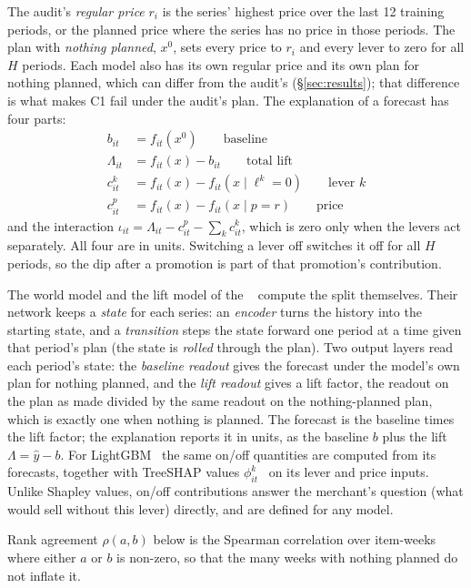 The audit's \emph{regular price} $r_i$ is the series' highest price over the
last 12 training periods, or the planned price where the series has no price in
those periods. The plan with \emph{nothing planned}, $x^{0}$, sets every price
to $r_i$ and every lever to zero for all $H$ periods. Each model also has its
own regular price and its own plan for nothing planned, which can differ from
the audit's (\S\ref{sec:results}); that difference is what makes C1 fail under
the audit's plan. The explanation of a forecast has four parts:
\begin{align}
  b_{it} &= f_{it}(x^{0}) \qquad \text{baseline}\\
  \Lambda_{it} &= f_{it}(x) - b_{it} \qquad \text{total lift}\\
  c^{k}_{it} &= f_{it}(x) - f_{it}(x \mid \ell^{k} = 0) \qquad \text{lever } k\\
  c^{p}_{it} &= f_{it}(x) - f_{it}(x \mid p = r) \qquad \text{price}
\end{align}
and the interaction $\iota_{it} = \Lambda_{it} - c^{p}_{it} - \sum_k c^{k}_{it}$,
which is zero only when the levers act separately. All four are in units.
Switching a lever off switches it off for all $H$ periods, so the dip after a
promotion is part of that promotion's contribution.

The world model and the lift model of the \companion{} ~\cite{rwm} compute
the split themselves. Their network keeps a \emph{state} for each series: an
\emph{encoder} turns the history into the starting state, and a
\emph{transition} steps the state forward one period at a time given that
period's plan (the state is \emph{rolled} through the plan). Two output layers
read each period's state: the \emph{baseline readout} gives the forecast under
the model's own plan for nothing planned, and the \emph{lift readout} gives a
lift factor, the readout on the plan as made divided by the same readout on the
nothing-planned plan, which is exactly one when nothing is planned. The forecast
is the baseline times the lift factor; the explanation reports it in units, as
the baseline $b$ plus the lift $\Lambda = \hat y - b$. For
LightGBM~\cite{lightgbm} the same on/off quantities are computed from its
forecasts, together with TreeSHAP values $\phi^{k}_{it}$~\cite{lundberg2020}
on its lever and price inputs. Unlike Shapley values, on/off contributions
answer the merchant's question (what would sell without this lever) directly,
and are defined for any model.

Rank agreement $\rho(a, b)$ below is the Spearman correlation over item-weeks
where either $a$ or $b$ is non-zero, so that the many weeks with nothing planned
do not inflate it.

